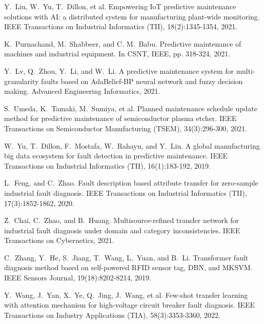 \documentclass[11pt]{article}
\begin{document}
\begin{thebibliography}{10}
\begin{small}

 Y.~Liu, W.~Yu, T.~Dillon, et al. \newblock Empowering IoT predictive maintenance solutions with AI: a distributed system for manufacturing plant-wide monitoring. \newblock IEEE Transactions on Industrial Informatics (TII), 18(2):1345-1354, 2021.


 K.~Purnachand, M.~Shabbeer, and C. M.~Babu. \newblock Predictive maintenance of machines and industrial equipment. \newblock In CSNT, IEEE, pp. 318-324, 2021.

 Y.~Lv, Q.~Zhou, Y.~Li, and W.~Li. \newblock A predictive maintenance system for multi-granularity faults based on AdaBelief-BP neural network and fuzzy decision making. \newblock  Advanced Engineering Informatics, 2021.

 S.~Umeda, K.~Tamaki, M.~Sumiya, et al. \newblock Planned maintenance schedule update method for predictive maintenance of semiconductor plasma etcher. \newblock IEEE Transactions on Semiconductor Manufacturing (TSEM), 34(3):296-300, 2021.

 W.~Yu, T.~Dillon, F.~Mostafa, W.~Rahayu, and Y.~Liu. \newblock A global manufacturing big data ecosystem for fault detection in predictive maintenance. \newblock IEEE Transactions on Industrial Informatics (TII), 16(1):183-192, 2019.

 L.~Feng, and C.~Zhao. \newblock Fault description based attribute transfer for zero-sample industrial fault diagnosis. \newblock IEEE Transactions on Industrial Informatics (TII), 17(3):1852-1862, 2020.


 Z.~Chai, C.~Zhao, and B.~Huang. \newblock Multisource-refined transfer network for industrial fault diagnosis under domain and category inconsistencies. \newblock IEEE Transactions on Cybernetics, 2021.


 C.~Zhang, Y.~He, S.~Jiang, T.~Wang, L.~Yuan, and B.~Li. \newblock Transformer fault diagnosis method based on self-powered RFID sensor tag, DBN, and MKSVM. \newblock IEEE Sensors Journal, 19(18):8202-8214, 2019.

 Y.~Wang, J.~Yan, X.~Ye, Q.~Jing, J.~Wang, et al. \newblock
Few-shot transfer learning with attention mechanism for high-voltage circuit breaker fault diagnosis. \newblock IEEE Transactions on Industry Applications (TIA), 58(3):3353-3360, 2022.



\end{small}
\end{thebibliography}
\end{document}
